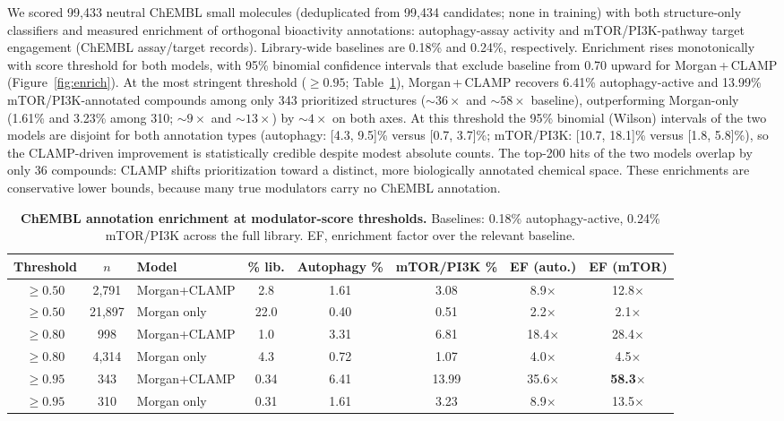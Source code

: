 \documentclass[11pt]{article}
\begin{document}
We scored 99{,}433 neutral ChEMBL small molecules (deduplicated from 99{,}434
candidates; none in training) with both structure-only classifiers and
measured enrichment of orthogonal bioactivity annotations: autophagy-assay
activity and mTOR/PI3K-pathway target engagement (ChEMBL assay/target
records). Library-wide baselines are 0.18\% and 0.24\%, respectively.
Enrichment rises monotonically with score threshold for both models, with
95\% binomial confidence intervals that exclude baseline from 0.70 upward for
Morgan\,+\,CLAMP (Figure~\ref{fig:enrich}). At the most stringent threshold
($\geq0.95$; Table~\ref{tab:enrich}), Morgan\,+\,CLAMP recovers 6.41\%
autophagy-active and 13.99\% mTOR/PI3K-annotated compounds among only 343
prioritized structures (${\sim}36\times$ and ${\sim}58\times$ baseline),
outperforming Morgan-only (1.61\% and 3.23\% among 310; ${\sim}9\times$ and
${\sim}13\times$) by ${\sim}4\times$ on both axes. At this threshold the 95\%
binomial (Wilson) intervals of the two models are disjoint for both
annotation types (autophagy: [4.3, 9.5]\% versus [0.7, 3.7]\%; mTOR/PI3K:
[10.7, 18.1]\% versus [1.8, 5.8]\%), so the CLAMP-driven improvement is
statistically credible despite modest absolute counts. The top-200 hits of the
two models overlap by only 36 compounds: CLAMP shifts prioritization toward a
distinct, more biologically annotated chemical space. These enrichments are
conservative lower bounds, because many true modulators carry no ChEMBL
annotation.

\begin{table}[!htb]
  \centering
  \caption{\textbf{ChEMBL annotation enrichment at modulator-score
  thresholds.} Baselines: 0.18\% autophagy-active, 0.24\% mTOR/PI3K across
  the full library. EF, enrichment factor over the relevant baseline.}
  \label{tab:enrich}
  \footnotesize
  \begin{tabular}{cclccccc}
    \toprule
    Threshold & $n$ & Model & \% lib. & Autophagy \% & mTOR/PI3K \% &
    EF (auto.) & EF (mTOR) \\
    \midrule
    $\geq 0.50$ & 2{,}791  & Morgan+CLAMP & 2.8  & 1.61 & 3.08 & 8.9$\times$  & 12.8$\times$ \\
    $\geq 0.50$ & 21{,}897 & Morgan only  & 22.0 & 0.40 & 0.51 & 2.2$\times$  & 2.1$\times$ \\
    \midrule
    $\geq 0.80$ & 998      & Morgan+CLAMP & 1.0  & 3.31 & 6.81 & 18.4$\times$ & 28.4$\times$ \\
    $\geq 0.80$ & 4{,}314  & Morgan only  & 4.3  & 0.72 & 1.07 & 4.0$\times$  & 4.5$\times$ \\
    \midrule
    $\geq 0.95$ & 343      & Morgan+CLAMP & 0.34 & 6.41 & 13.99 & 35.6$\times$ & \textbf{58.3$\times$} \\
    $\geq 0.95$ & 310      & Morgan only  & 0.31 & 1.61 & 3.23 & 8.9$\times$  & 13.5$\times$ \\
    \bottomrule
  \end{tabular}
\end{table}
\end{document}

